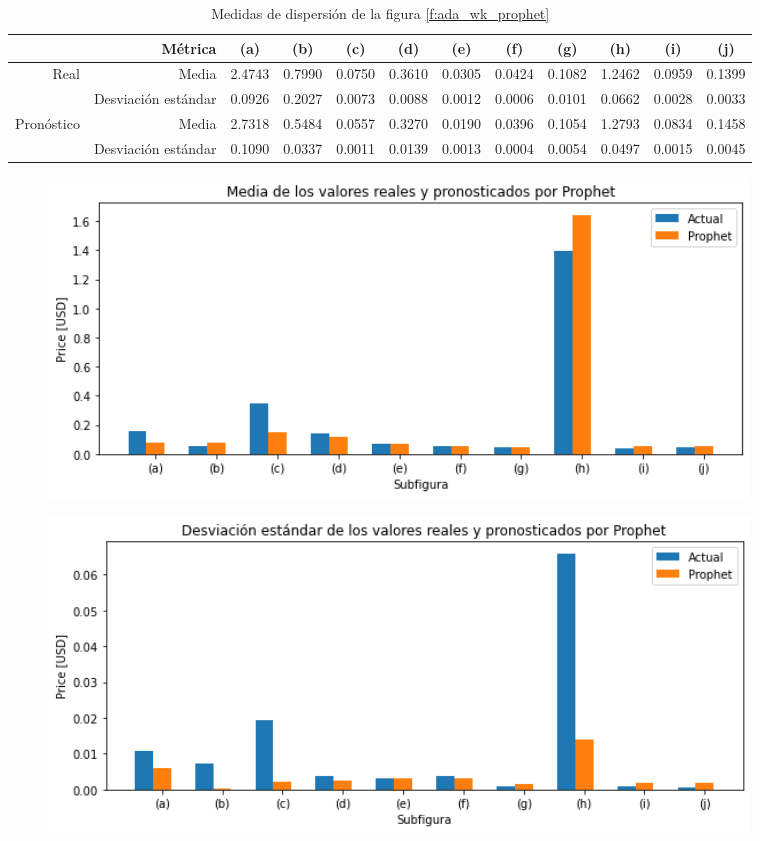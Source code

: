 \documentclass[a4paper,10pt]{article}
\begin{document}
\begin{table}[H]
 \begin{center}
 \resizebox{12cm}{!} {
  \begin{tabular}{|r|r|c|c|c|c|c|c|c|c|c|c|}
    & Métrica & (a) & (b) & (c) & (d) & (e) & (f) & (g) & (h) & (i) & (j) \\ \hline
    Real & Media & 2.4743 & 0.7990 & 0.0750 & 0.3610 & 0.0305 & 0.0424 & 0.1082 & 1.2462 & 0.0959 & 0.1399\\
    & Desviación estándar & 0.0926 & 0.2027 & 0.0073 & 0.0088 & 0.0012 & 0.0006 & 0.0101 & 0.0662 & 0.0028 & 0.0033\\
    Pronóstico & Media & 2.7318 & 0.5484 & 0.0557 & 0.3270 & 0.0190 & 0.0396 & 0.1054 & 1.2793 & 0.0834 & 0.1458\\
    & Desviación estándar & 0.1090 & 0.0337 & 0.0011 & 0.0139 & 0.0013 & 0.0004 & 0.0054 & 0.0497 & 0.0015 & 0.0045\\ \hline
  \end{tabular}
  }
  \caption{Medidas de dispersión de la figura \ref{f:ada_wk_prophet}}
  \label{tab:ada_wk_avestd}
 \end{center}
\end{table}

\begin{figure}[H]
\centering
\includegraphics[width=0.9\textwidth]{./plots/prophet/ada/week/ave}
\label{f:ada_ave_wk}
\end{figure}

\begin{figure}[H]
\centering
\includegraphics[width=0.9\textwidth]{./plots/prophet/ada/week/std}
\label{f:ada_std_wk}
\end{figure}
\end{document}
